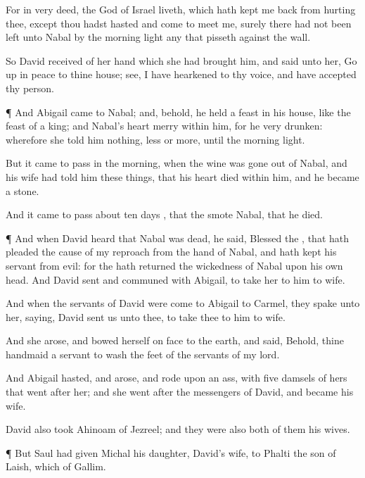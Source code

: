 {For in very
deed,
{} the
{}
God of
Israel
liveth, which hath kept me
back from
hurting thee,
except thou hadst
hasted and
come to
meet me, surely there had not been
left unto
Nabal by the
morning
light any that
pisseth against the
wall.

So
David
received of her
hand
{} which she had
brought him, and
said unto her, Go
up in
peace to thine
house;
see, I have
hearkened to thy
voice, and have
accepted thy
person.


\par }{\PP {}¶ And
Abigail
came to
Nabal; and, behold, he held a
feast in his
house, like the
feast of a
king; and
Nabal’s
heart
{}
merry within him, for he
{}
very
drunken: wherefore she
told him
nothing,
less or
more, until the
morning
light.

But it came to pass in the
morning, when the
wine was gone
out of
Nabal, and his
wife had
told him these
things, that his
heart
died
within him, and he became
{} a
stone.

And it came to pass about
ten
days
{}, that the
{}
smote
Nabal, that he
died.


\par }{\PP {}¶ And when
David
heard that
Nabal was
dead, he
said,
Blessed
{} the
{}, that hath
pleaded the
cause of my
reproach from the
hand of
Nabal, and hath
kept his
servant from
evil: for the
{} hath
returned the
wickedness of
Nabal upon his own
head. And
David
sent and
communed with
Abigail, to
take her to him to
wife.

And when the
servants of
David were
come to
Abigail to
Carmel, they
spake unto her,
saying,
David
sent us unto thee, to
take thee to him to
wife.

And she
arose, and
bowed herself on
{}
face to the
earth, and
said, Behold,
{} thine
handmaid
{} a
servant to
wash the
feet of the
servants of my
lord.

And
Abigail
hasted, and
arose, and
rode upon an
ass, with
five
damsels of hers that
went
after her; and she
went
after the
messengers of
David, and became his
wife.

David also
took
Ahinoam of
Jezreel; and they were also
both of them his
wives.


\par }{\PP {}¶ But
Saul had
given
Michal his
daughter,
David’s
wife, to
Phalti the
son of
Laish, which
{} of
Gallim.




}
